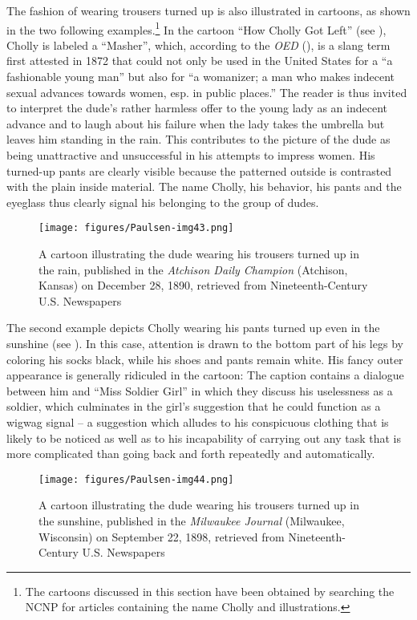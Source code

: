 The fashion of wearing trousers turned up is also illustrated in cartoons, as shown in the two following examples.\footnote{The cartoons discussed in this section have been obtained by searching the NCNP for articles containing the name Cholly and illustrations.} In the cartoon “How Cholly Got Left” (see ), Cholly is labeled a “Masher”, which, according to the \emph{OED} (\citeyear{masher}), is a slang term first attested in 1872 that could not only be used in the United States for a “a fashionable young man” but also for “a womanizer; a man who makes indecent sexual advances towards women, esp. in public places.” The reader is thus invited to interpret the dude's rather harmless offer to the young lady as an indecent advance and to laugh about his failure when the lady takes the umbrella but leaves him standing in the rain. This contributes to the picture of the dude as being unattractive and unsuccessful in his attempts to impress women. His turned-up pants are clearly visible because the patterned outside is contrasted with the plain inside material. The name Cholly, his behavior, his pants and the eyeglass thus clearly signal his belonging to the group of dudes.


\begin{figure}
\texttt{[image: figures/Paulsen-img43.png]}
\caption{
A cartoon illustrating the dude wearing his trousers turned up in the rain, published in the \emph{Atchison Daily Champion} (Atchison, Kansas) on December 28, 1890, retrieved from Nineteenth-Century U.S. Newspapers
}
\label{fig:key:43}
\end{figure}

The second example depicts Cholly wearing his pants turned up even in the sunshine (see ). In this case, attention is drawn to the bottom part of his legs by coloring his socks black, while his shoes and pants remain white. His fancy outer appearance is generally ridiculed in the cartoon: The caption contains a dialogue between him and “Miss Soldier Girl” in which they discuss his uselessness as a soldier, which culminates in the girl’s suggestion that he could function as a wigwag signal – a suggestion which alludes to his conspicuous clothing that is likely to be noticed as well as to his incapability of carrying out any task that is more complicated than going back and forth repeatedly and automatically.


\begin{figure}
\texttt{[image: figures/Paulsen-img44.png]}
\caption{
A cartoon illustrating the dude wearing his trousers turned up in the sunshine, published in the \emph{Milwaukee Journal} (Milwaukee, Wisconsin) on September 22, 1898, retrieved from Nineteenth-Century U.S. Newspapers
}
\label{fig:key:44}
\end{figure}

